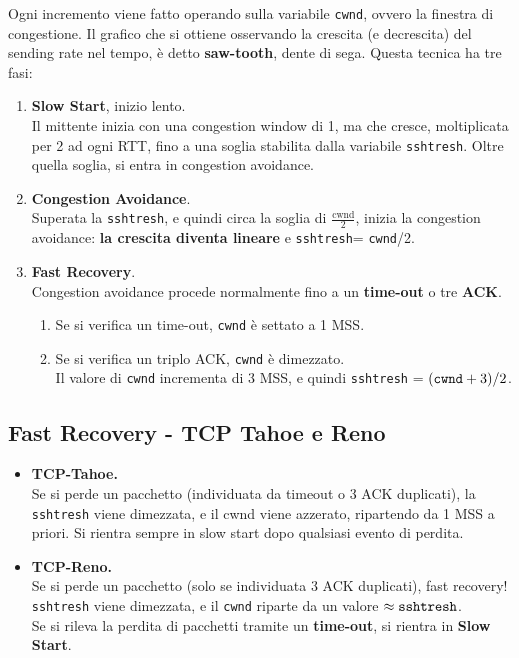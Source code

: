 Ogni incremento viene fatto operando sulla variabile \verb|cwnd|, ovvero la finestra di congestione. 
Il grafico che si ottiene osservando la crescita (e decrescita) del sending rate nel tempo, è detto \textbf{saw-tooth}, dente di sega. Questa tecnica ha tre fasi:
\begin{enumerate}
	\item \textbf{Slow Start}, inizio lento.\\
	Il mittente inizia con una congestion window di 1, ma che cresce, moltiplicata per 2 ad ogni RTT, fino a una soglia stabilita dalla variabile \verb|sshtresh|. Oltre quella soglia, si entra in congestion avoidance.
	
	\item \textbf{Congestion Avoidance}.\\
	Superata la \verb|sshtresh|, e quindi circa la soglia di $\frac{\text{cwnd}}{2}$, inizia la congestion avoidance: \textbf{la crescita diventa lineare} e \verb|sshtresh|= \verb|cwnd|/2.
	\item \textbf{Fast Recovery}.\\
	Congestion avoidance procede normalmente fino a un \textbf{time-out} o tre \textbf{ACK}.
	
	\begin{enumerate}
		\item Se si verifica un time-out, \verb|cwnd| è settato a 1 MSS. 
		\item Se si verifica un triplo ACK, \verb|cwnd| è dimezzato.\\
		Il valore di \verb|cwnd| incrementa di 3 MSS, e quindi \verb|sshtresh| = $(\verb|cwnd|+3)/2$.
	\end{enumerate}
	
	
\end{enumerate}


\subsection{Fast Recovery - TCP Tahoe e Reno}

\begin{itemize}
	\item \textbf{TCP-Tahoe.}\\
	Se si perde un pacchetto (individuata da timeout o 3 ACK duplicati), la \verb|sshtresh| viene dimezzata, e il cwnd viene azzerato, ripartendo da 1 MSS a priori. Si rientra sempre in slow start dopo qualsiasi evento di perdita.
	\item \textbf{TCP-Reno.}\\
	Se si perde un pacchetto (solo se individuata 3 ACK duplicati), fast recovery! \verb|sshtresh| viene dimezzata, e il \verb|cwnd| riparte da un valore $\approx \verb|sshtresh|$.\\
	Se si rileva la perdita di pacchetti tramite un \textbf{time-out}, si rientra in \textbf{Slow Start}.
\end{itemize}

